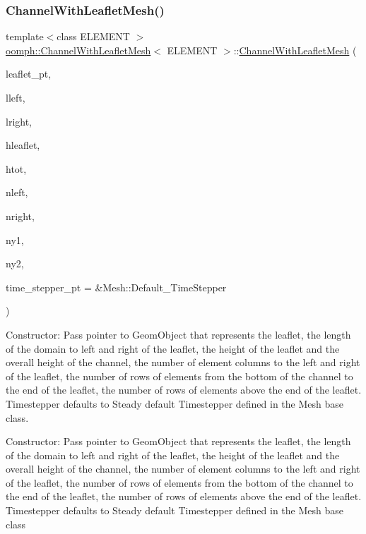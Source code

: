 \subsubsection{\texorpdfstring{Channel\+With\+Leaflet\+Mesh()}{ChannelWithLeafletMesh()}}
{\footnotesize\ttfamily template$<$class E\+L\+E\+M\+E\+NT $>$ \\
\hyperlink{classoomph_1_1ChannelWithLeafletMesh}{oomph\+::\+Channel\+With\+Leaflet\+Mesh}$<$ E\+L\+E\+M\+E\+NT $>$\+::\hyperlink{classoomph_1_1ChannelWithLeafletMesh}{Channel\+With\+Leaflet\+Mesh} (\begin{DoxyParamCaption}\item[{Geom\+Object $\ast$}]{leaflet\+\_\+pt,  }\item[{const double \&}]{lleft,  }\item[{const double \&}]{lright,  }\item[{const double \&}]{hleaflet,  }\item[{const double \&}]{htot,  }\item[{const unsigned \&}]{nleft,  }\item[{const unsigned \&}]{nright,  }\item[{const unsigned \&}]{ny1,  }\item[{const unsigned \&}]{ny2,  }\item[{Time\+Stepper $\ast$}]{time\+\_\+stepper\+\_\+pt = {\ttfamily \&Mesh\+:\+:Default\+\_\+TimeStepper} }\end{DoxyParamCaption})}



Constructor\+: Pass pointer to Geom\+Object that represents the leaflet, the length of the domain to left and right of the leaflet, the height of the leaflet and the overall height of the channel, the number of element columns to the left and right of the leaflet, the number of rows of elements from the bottom of the channel to the end of the leaflet, the number of rows of elements above the end of the leaflet. Timestepper defaults to Steady default Timestepper defined in the Mesh base class. 

Constructor\+: Pass pointer to Geom\+Object that represents the leaflet, the length of the domain to left and right of the leaflet, the height of the leaflet and the overall height of the channel, the number of element columns to the left and right of the leaflet, the number of rows of elements from the bottom of the channel to the end of the leaflet, the number of rows of elements above the end of the leaflet. Timestepper defaults to Steady default Timestepper defined in the Mesh base class 

